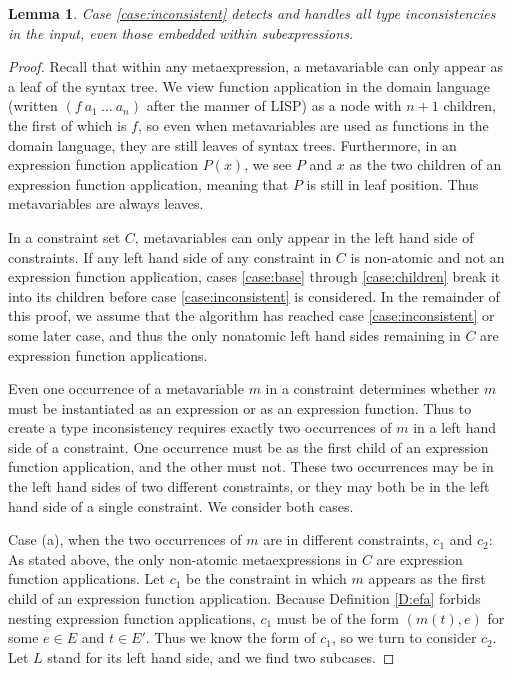 \documentclass{article}
\newtheorem{lem}{Lemma}
\begin{document}
\begin{lem}\label{L:consistent}
Case \ref{case:inconsistent} detects and handles all type inconsistencies in the input, even those embedded within subexpressions.
\end{lem}
\begin{proof}
Recall that within any metaexpression, a metavariable can only appear as a leaf of the syntax tree.  We view function application in the domain language (written $(f~a_1~\ldots~a_n)$ after the manner of LISP) as a node with $n+1$ children, the first of which is $f$, so even when metavariables are used as functions in the domain language, they are still leaves of syntax trees.  Furthermore, in an expression function application $P(x)$, we see $P$ and $x$ as the two children of an expression function application, meaning that $P$ is still in leaf position.  Thus metavariables are always leaves.

In a constraint set $C$, metavariables can only appear in the left hand side of constraints.  If any left hand side of any constraint in $C$ is non-atomic and not an expression function application, cases \ref{case:base} through \ref{case:children} break it into its children before case \ref{case:inconsistent} is considered.  In the remainder of this proof, we assume that the algorithm has reached case \ref{case:inconsistent} or some later case, and thus the only nonatomic left hand sides remaining in $C$ are expression function applications.

Even one occurrence of a metavariable $m$ in a constraint determines whether $m$ must be instantiated as an expression or as an expression function.  Thus to create a type inconsistency requires exactly two occurrences of $m$ in a left hand side of a constraint.  One occurrence must be as the first child of an expression function application, and the other must not.  These two occurrences may be in the left hand sides of two different constraints, or they may both be in the left hand side of a single constraint.  We consider both cases.

Case (a), when the two occurrences of $m$ are in different constraints, $c_1$ and $c_2$:  As stated above, the only non-atomic metaexpressions in $C$ are expression function applications.  Let $c_1$ be the constraint in which $m$ appears as the first child of an expression function application.  Because Definition \ref{D:efa} forbids nesting expression function applications, $c_1$ must be of the form $(m(t),e)$ for some $e\in E$ and $t\in E'$.  Thus we know the form of $c_1$, so we turn to consider $c_2$.  Let $L$ stand for its left hand side, and we find two subcases.


\end{proof}
\end{document}
